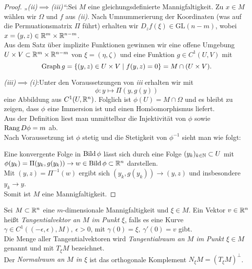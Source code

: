 \documentclass[skript.tex]{subfiles}
\begin{document}
\begin{proof}
		\emph{„(ii)$\implies$(iii)“}:\quad Sei $M$ eine gleichungsdefinierte Mannigfaltigkeit. Zu $x \in M$ wählen wir $\Omega$ und $f$ aus \emph{(ii)}. Nach Umnummerierung der Koordinaten (was auf die Permuationsmatrix $\Pi$ führt) erhalten wir $D_z f(\xi)\in\mathrm{GL}(n-m)$, wobei $x=(y,z)\in\mathbb{R}^m\times\mathbb{R}^{n-m}$.\\
		Aus dem Satz über implizite Funktionen gewinnen wir eine offene Umgebung\\$U \times V \subset \mathbb{R}^m\times\mathbb{R}^{n-m}$ von $\xi = (\eta,\zeta)$ und eine Funktion $g \in C^1(U,V)$ mit
		\[
			\operatorname{Graph} g = \{(y,z) \in U \times V \mid f(y,z) = 0\} = M \cap (U \times V).
		\]
		
		\emph{(iii)$\implies$(i)}:\quad Unter den Voraussetzungen von \emph{iii} erhalten wir mit
		\[
			\phi \colon y \mapsto \Pi(y,g(y))
		\]
		eine Abbildung aus $C^1(U,\mathbb{R}^n)$. Folglich ist $\phi(U)=M\cap\Omega$ und es bleibt zu zeigen, dass $\phi$ eine Immersion ist und einen Homöomorphismus liefert.\\
		Aus der Definition liest man unmittelbar die Injektivität von $\phi$ sowie $\operatorname{\operatorname{Rang}} D\phi=m$ ab.\\Nach Voraussetzung ist $\phi$ stetig und die Stetigkeit von $\phi^{-1}$ sieht man wie folgt:
		
		Eine konvergente Folge in $\operatorname{Bild}\phi$ lässt sich durch eine Folge $(y_k)_{k\in\mathbb{N}}\subset U$ mit\\
		$\phi(y_k) = \Pi(y_k,g(y_k))\to w\in\operatorname{Bild}\phi\subset\mathbb{R}^n$
		darstellen.\\
		Mit $(y,z)=\Pi^{-1}(w)$
		ergibt sich $(y_k,g(y_k)) \to (y,z)$ und insbesondere $y_k\to y$.\\
		Somit ist $M$ eine Mannigfaltigkeit.
	\end{proof}
	
	\begin{defin}
		Sei $M \subset \mathbb{R}^n$ eine $m$-dimensionale Mannigfaltigkeit und $\xi \in M$. Ein Vektor $v \in \mathbb{R}^n$ heißt \emph{Tangentialvektor an $M$ im Punkt $\xi$}, falls es eine Kurve $\gamma \in C^1((-\epsilon,\epsilon),M),\ \epsilon>0$, mit $\gamma(0)=\xi,\ \gamma'(0) = v$ gibt.\\
		Die Menge aller Tangentialvektoren wird \emph{Tangentialraum an $M$ im Punkt $\xi \in M$} genannt und mit $T_\xi M$ bezeichnet.\\
		Der \emph{Normalraum an $M$ in $\xi$} ist das orthogonale Komplement $N_\xi M = (T_\xi M)^\perp$.
	\end{defin}
\end{document}
